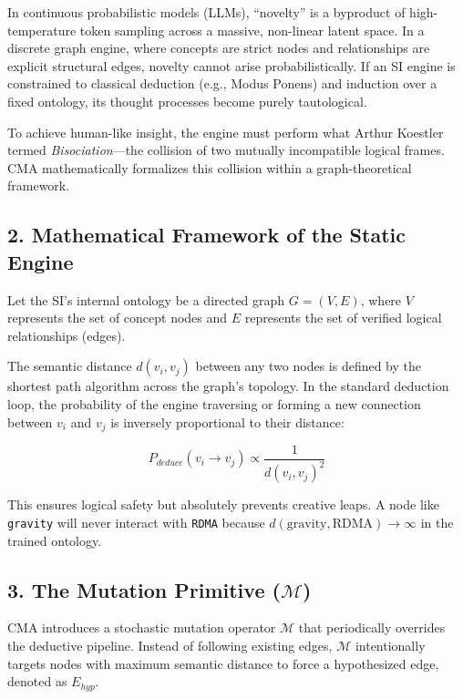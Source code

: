 \documentclass[
  11pt,
  a4paper,
]{article}
\begin{document}
In continuous probabilistic models (LLMs), ``novelty'' is a byproduct of
high-temperature token sampling across a massive, non-linear latent
space. In a discrete graph engine, where concepts are strict nodes and
relationships are explicit structural edges, novelty cannot arise
probabilistically. If an SI engine is constrained to classical deduction
(e.g., Modus Ponens) and induction over a fixed ontology, its thought
processes become purely tautological.

To achieve human-like insight, the engine must perform what Arthur
Koestler termed \emph{Bisociation}---the collision of two mutually
incompatible logical frames. CMA mathematically formalizes this
collision within a graph-theoretical framework.

\subsection{2. Mathematical Framework of the Static
Engine}\label{mathematical-framework-of-the-static-engine}

Let the SI's internal ontology be a directed graph \(G = (V, E)\), where
\(V\) represents the set of concept nodes and \(E\) represents the set
of verified logical relationships (edges).

The semantic distance \(d(v_i, v_j)\) between any two nodes is defined
by the shortest path algorithm across the graph's topology. In the
standard deduction loop, the probability of the engine traversing or
forming a new connection between \(v_i\) and \(v_j\) is inversely
proportional to their distance:

\[ P_{deduce}(v_i \rightarrow v_j) \propto \frac{1}{d(v_i, v_j)^2} \]

This ensures logical safety but absolutely prevents creative leaps. A
node like \texttt{gravity} will never interact with \texttt{RDMA}
because \(d(\text{gravity}, \text{RDMA}) \to \infty\) in the trained
ontology.

\subsection{\texorpdfstring{3. The Mutation Primitive
(\(\mathcal{M}\))}{3. The Mutation Primitive (\textbackslash mathcal\{M\})}}\label{the-mutation-primitive-mathcalm}

CMA introduces a stochastic mutation operator \(\mathcal{M}\) that
periodically overrides the deductive pipeline. Instead of following
existing edges, \(\mathcal{M}\) intentionally targets nodes with maximum
semantic distance to force a hypothesized edge, denoted as \(E_{hyp}\).
\end{document}
